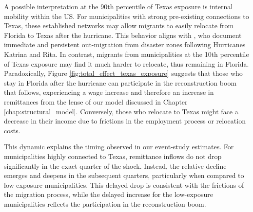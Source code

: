 A possible interpretation at the 90th percentile of Texas exposure is internal mobility within the US. For municipalities with strong pre-existing connections to Texas, these established networks may allow migrants to easily relocate from Florida to Texas after the hurricane. This behavior aligns with \textcite{fussell_2023}, who document immediate and persistent out-migration from disaster zones following Hurricanes Katrina and Rita. In contrast, migrants from municipalities at the 10th percentile of Texas exposure may find it much harder to relocate, thus remaining in Florida. Paradoxically, Figure \ref{fig:total_effect_texas_exposure} suggests that those who stay in Florida after the hurricane can participate in the reconstruction boom that follows, experiencing a wage increase and therefore an increase in remittances from the lense of our model discussed in Chapter \ref{chap:structural_model}. Conversely, those who relocate to Texas might face a decrease in their income due to frictions in the employment process or relocation costs. 
\par
This dynamic explains the timing observed in our event-study estimates. For municipalities highly connected to Texas, remittance inflows do not drop significantly in the exact quarter of the shock. Instead, the relative decline emerges and deepens in the subsequent quarters, particularly when compared to low-exposure municipalities. This delayed drop is consistent with the frictions of the migration process, while the delayed increase for the low-exposure municipalities reflects the participation in the reconstruction boom.